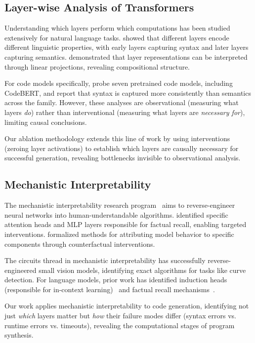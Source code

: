 \documentclass[preprint,12pt,authoryear]{elsarticle}
\begin{document}
\subsection{Layer-wise Analysis of Transformers}

Understanding which layers perform which computations has been studied extensively for natural language tasks. \citet{clark2019what} showed that different layers encode different linguistic properties, with early layers capturing syntax and later layers capturing semantics. \citet{voita2019analyzing} demonstrated that layer representations can be interpreted through linear projections, revealing compositional structure.

For code models specifically, \citet{ma2024unveiling} probe seven pretrained code models, including CodeBERT, and report that syntax is captured more consistently than semantics across the family. However, these analyses are observational (measuring what layers \emph{do}) rather than interventional (measuring what layers are \emph{necessary for}), limiting causal conclusions.

Our ablation methodology extends this line of work by using interventions (zeroing layer activations) to establish which layers are causally necessary for successful generation, revealing bottlenecks invisible to observational analysis.

\subsection{Mechanistic Interpretability}

The mechanistic interpretability research program~\cite{olsson2022in,conmy2023towards} aims to reverse-engineer neural networks into human-understandable algorithms. \citet{meng2022locating} identified specific attention heads and MLP layers responsible for factual recall, enabling targeted interventions. \citet{vig2020causal} formalized methods for attributing model behavior to specific components through counterfactual interventions.

The circuits thread in mechanistic interpretability has successfully reverse-engineered small vision models, identifying exact algorithms for tasks like curve detection. For language models, prior work has identified induction heads (responsible for in-context learning)~\cite{olsson2022in} and factual recall mechanisms~\cite{meng2022locating}.

Our work applies mechanistic interpretability to code generation, identifying not just \emph{which} layers matter but \emph{how} their failure modes differ (syntax errors vs. runtime errors vs. timeouts), revealing the computational stages of program synthesis.
\end{document}
